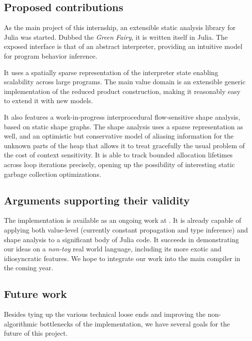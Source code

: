 \documentclass[11pt]{article}
\begin{document}
\subsection*{Proposed contributions}

As the main project of this internship, an extensible static analysis library for Julia was started. Dubbed the \emph{Green Fairy}, it is written itself in Julia. The exposed interface is that of an abstract interpreter, providing an intuitive model for program behavior inference.

It uses a spatially sparse representation of the interpreter state enabling scalability across large programs. The main value domain is an extensible generic implementation of the reduced product construction, making it reasonably easy to extend it with new models.

It also features a work-in-progress interprocedural flow-sensitive shape analysis, based on static shape graphs\cite{ssc}. The shape analysis uses a sparse representation as well, and an optimistic but conservative model of aliasing information for the unknown parts of the heap that allows it to treat gracefully the usual problem of the cost of context sensitivity. It is able to track bounded allocation lifetimes across loop iterations precisely, opening up the possibility of interesting static garbage collection optimizations.

\subsection*{Arguments supporting their validity}

The implementation is available as an ongoing work at \cite{gf-web}. It is already capable of applying both value-level (currently constant propagation and type inference) and shape analysis to a significant body of Julia code.
It succeeds in demonstrating our ideas on a \emph{non-toy} real world language, including its more exotic and idiosyncratic features.
We hope to integrate our work into the main compiler in the coming year.

\subsection*{Future work}

Besides tying up the various technical loose ends and improving the non-algorithmic bottlenecks of the implementation, we have several goals for the future of this project.
\end{document}
